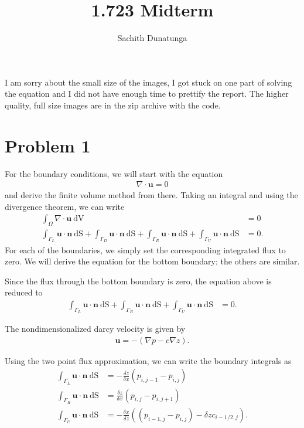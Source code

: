\documentclass{article}
\title{1.723 Midterm}
\author{Sachith  Dunatunga}
\begin{document}
\maketitle

I am sorry about the small size of the images, I got stuck on one part of solving the equation and I did not have enough time to prettify the report. The higher quality, full size images are in the zip archive with the code.

\section{Problem 1}
For the boundary conditions, we will start with the equation
\begin{align}
 \nabla \cdot \mathbf{u} = 0
\end{align}
and derive the finite volume method from there.
Taking an integral and using the divergence theorem, we can write
\begin{align}
\int_\Omega \nabla \cdot \mathbf{u}\ \mathrm{dV} &= 0 \\
\int_{\Gamma_{L}} \mathbf{u} \cdot \mathbf{n}\ \mathrm{dS} +
\int_{\Gamma_{D}} \mathbf{u} \cdot \mathbf{n}\ \mathrm{dS} +
\int_{\Gamma_{R}} \mathbf{u} \cdot \mathbf{n}\ \mathrm{dS} +
\int_{\Gamma_{U}} \mathbf{u} \cdot \mathbf{n}\ \mathrm{dS} &= 0.
\end{align}
For each of the boundaries, we simply set the corresponding integrated flux to zero.
We will derive the equation for the bottom boundary; the others are similar.

Since the flux through the bottom boundary is zero, the equation above is reduced to
\begin{align}
\int_{\Gamma_{L}} \mathbf{u} \cdot \mathbf{n}\ \mathrm{dS} +
\int_{\Gamma_{R}} \mathbf{u} \cdot \mathbf{n}\ \mathrm{dS} +
\int_{\Gamma_{U}} \mathbf{u} \cdot \mathbf{n}\ \mathrm{dS} &= 0.
\end{align}

The nondimensionalized darcy velocity is given by
\begin{align}
\mathbf{u} = - (\nabla p - c \nabla z).
\end{align}

Using the two point flux approximation, we can write the boundary integrals as
\begin{align}
\int_{\Gamma_{L}} \mathbf{u} \cdot \mathbf{n}\ \mathrm{dS} &= - \frac{\delta z}{\delta x} (p_{i,j-1} - p_{i,j}) \\
\int_{\Gamma_{R}} \mathbf{u} \cdot \mathbf{n}\ \mathrm{dS} &= \frac{\delta z}{\delta x} (p_{i,j} - p_{i,j+1}) \\
\int_{\Gamma_{U}} \mathbf{u} \cdot \mathbf{n}\ \mathrm{dS} &= - \frac{\delta x}{\delta z} \left( (p_{i-1,j} - p_{i,j}) - \delta z c_{i-1/2,j} \right).
\end{align}
\end{document}
